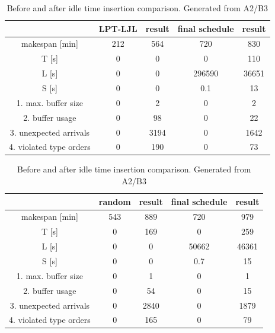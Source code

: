\documentclass{ctuthesis}
\begin{document}
\begin{table}[H]
\begin{tabular}{ |c|| c | c | c | c |} 
\hline
 & LPT-LJL & result & final schedule & result \\ 
\hline
makespan [min] & 212 & 564 & 720 & 830 \\
\hline
T [s]& 0 & 0 & 0 & 110 \\
\hline
L [s]& 0 & 0 & 296590 & 36651 \\
\hline
S [s]& 0 & 0 & 0.1 & 13 \\
\hline
1. max. buffer size & 0 & 2 & 0 & 2\\ 
\hline
2. buffer usage  & 0 & 98 & 0 & 22\\ 
\hline
3. unexpected arrivals & 0 & 3194 & 0 & 1642\\ 
\hline
4. violated type orders & 0 & 190 & 0 & 73\\ 
\hline
\end{tabular}
\caption{Before and after idle time insertion comparison. Generated from A2/B3}
\end{table}

\begin{table}[H]
\begin{tabular}{ |c|| c | c | c | c |} 
\hline
 & random & result & final schedule & result \\ 
\hline
makespan [min] & 543 & 889 & 720 & 979 \\
\hline
T [s]& 0 & 169 & 0 & 259 \\
\hline
L [s]& 0 & 0 & 50662 & 46361 \\
\hline
S [s]& 0 & 0 & 0.7 & 15 \\
\hline
1. max. buffer size & 0 & 1 & 0 & 1\\ 
\hline
2. buffer usage  & 0 & 54 & 0 & 15\\ 
\hline
3. unexpected arrivals & 0 & 2840 & 0 & 1879\\ 
\hline
4. violated type orders & 0 & 165 & 0 & 79\\ 
\hline
\end{tabular}
\caption{Before and after idle time insertion comparison. Generated from A2/B3}
\end{table}
\end{document}
